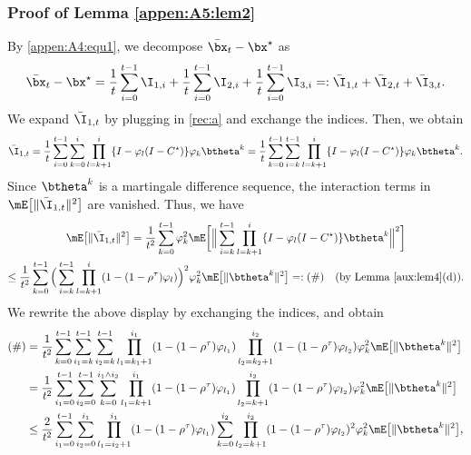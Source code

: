 \subsubsection{Proof of Lemma \ref{appen:A5:lem2}}\label{pf:barx}

By \eqref{appen:A4:equ1}, we decompose $\bar{\bx}_t-\bx^\star$ as
\begin{equation}\label{appen:A5:equ4}
\bar{\bx}_t-\bx^\star = \frac{1}{t}\sum_{i=0}^{t-1}\I_{1,i} + \frac{1}{t}\sum_{i=0}^{t-1}\I_{2,i}
+\frac{1}{t}\sum_{i=0}^{t-1}\I_{3,i}=: \bar{\I}_{1,t}
+\bar{\I}_{2,t}+\bar{\I}_{3,t}.
\end{equation}
We expand $\bar{\I}_{1,t}$ by plugging in \eqref{rec:a} and exchange the indices. Then, we obtain
\begin{equation*}
\bar{\I}_{1, t}=\frac{1}{t} \sum_{i=0}^{t-1} \sum_{k=0}^i \prod_{l=k+1}^i \{I-\varphi_l (I-C^\star)\} \varphi_k \btheta^k =\frac{1}{t} \sum_{k=0}^{t-1}\sum_{i=k}^{t-1} \prod_{l=k+1}^i \{I-\varphi_l (I-C^\star)\} \varphi_k \btheta^k.    
\end{equation*}
Since $\btheta^k$ is a martingale difference sequence, the interaction terms in $\mE\big[\|\bar{\I}_{1,t}\|^2\big]$ are vanished. Thus, we have
\begin{multline*}
\mE\big[\|\bar{\I}_{1,t}\|^2\big] 
= \frac{1}{t^2} \sum_{k=0}^{t-1}\varphi_k^2
\mE\bigg[\Big\|\sum_{i=k}^{t-1} \prod_{l=k+1}^i \{I-\varphi_l (I-C^\star)\} \btheta^k\Big\|^2\bigg]\\
\leq \frac{1}{t^2} \sum_{k=0}^{t-1}
\Big(\sum_{i=k}^{t-1} \prod_{l=k+1}^i (1- (1-\rho^\tau)\varphi_l)\Big)^2 \varphi_k^2 \mE\big[\|\btheta^k\|^2\big]=:(\#)\quad\text{(by Lemma \ref{aux:lem4}(d))}.
\end{multline*}
We rewrite the above display by exchanging the indices, and obtain
\begin{align*}
(\#) &= \frac{1}{t^2} \sum_{k=0}^{t-1}
\sum_{i_1=k}^{t-1}\sum_{i_2=k}^{t-1} \prod_{l_1=k_1+1}^{i_1} (1- (1-\rho^\tau)\varphi_{l_1}) \prod_{l_2=k_2+1}^{i_2} (1- (1-\rho^\tau)\varphi_{l_2})\varphi_k^2 \mE\big[\|\btheta^k\|^2\big]\\
&=\frac{1}{t^2} \sum_{i_1=0}^{t-1} \sum_{i_2=0}^{t-1} \sum_{k=0}^{i_1\wedge i_2} \prod_{l_1=k+1}^{i_1}(1- (1-\rho^\tau)\varphi_{l_1}) \prod_{l_2=k+1}^{i_2}(1- (1-\rho^\tau)\varphi_{l_2}) \varphi_k^2 \mE\big[\|\btheta^k\|^2\big]\\
&\leq \frac{2}{t^2}\sum_{i_1=0}^{t-1} \sum_{i_2=0}^{i_1}\prod_{l_1=i_2+1}^{i_1}(1- (1-\rho^\tau)\varphi_{l_1}) \sum_{k=0}^{i_2} \prod_{l_2=k+1}^{i_2}(1- (1-\rho^\tau)\varphi_{l_2})^2 \varphi_k^2 \mE\big[\|\btheta^k\|^2\big],
\end{align*}
